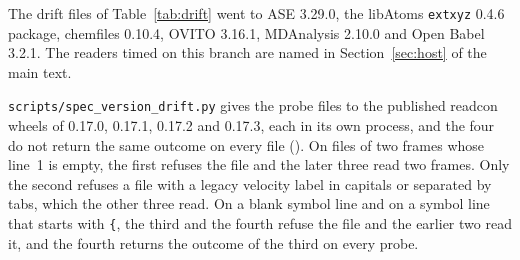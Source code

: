\documentclass[preprint,12pt]{elsarticle}
\begin{document}
The drift files of Table~\ref{tab:drift} went to ASE 3.29.0, the libAtoms \texttt{extxyz} 0.4.6 package, chemfiles 0.10.4, OVITO 3.16.1, MDAnalysis 2.10.0 and Open Babel 3.2.1.
The readers timed on this branch are named in Section~\ref{sec:host} of the main text.

\texttt{scripts/\allowbreak spec\_version\_drift.py} gives the probe files to the published readcon wheels of 0.17.0, 0.17.1, 0.17.2 and 0.17.3, each in its own process, and the four do not return the same outcome on every file ().
On files of two frames whose line~1 is empty, the first refuses the file and the later three read two frames.
Only the second refuses a file with a legacy velocity label in capitals or separated by tabs, which the other three read.
On a blank symbol line and on a symbol line that starts with \texttt{\{}, the third and the fourth refuse the file and the earlier two read it, and the fourth returns the outcome of the third on every probe.
\end{document}
